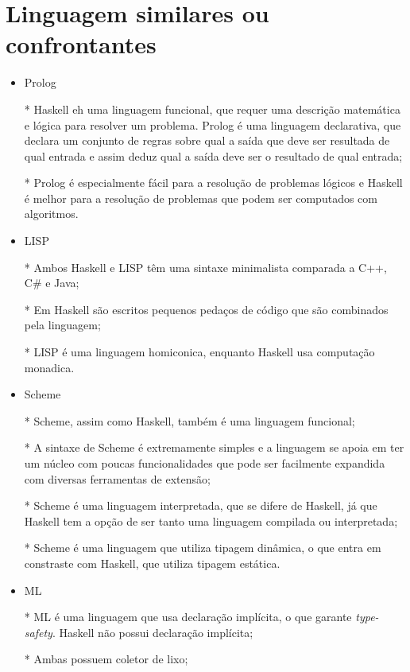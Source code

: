 \chapter{Linguagem similares ou confrontantes}

    \begin{itemize}
      \item Prolog
      
      * Haskell eh uma linguagem funcional, que requer uma descrição matemática e lógica para resolver um problema. Prolog é uma linguagem declarativa, 
      que declara um conjunto de regras sobre qual a saída que deve ser resultada de qual entrada e assim deduz qual a saída deve ser o resultado de qual entrada;

      * Prolog é especialmente fácil para a resolução de problemas lógicos e Haskell é melhor para a resolução de problemas que podem ser computados com algoritmos.

      \item LISP 
      
      * Ambos Haskell e LISP têm uma sintaxe minimalista comparada a C++, C\# e Java;

      * Em Haskell são escritos pequenos pedaços de código que são combinados pela linguagem;

      * LISP é uma linguagem homiconica, enquanto Haskell usa computação monadica.

      \item Scheme 
      
      * Scheme, assim como Haskell, também é uma linguagem funcional;

      * A sintaxe de Scheme é extremamente simples e a linguagem se apoia em ter um núcleo com poucas funcionalidades que pode ser 
      facilmente expandida com diversas ferramentas de extensão;

      * Scheme é uma linguagem interpretada, que se difere de Haskell, já que Haskell tem a opção de ser tanto uma linguagem compilada ou interpretada;

      * Scheme é uma linguagem que utiliza tipagem dinâmica, o que entra em constraste com Haskell, que utiliza tipagem estática.

      \item ML 
      
      * ML é uma linguagem que usa declaração implícita, o que garante \emph{type-safety}. Haskell não possui declaração implícita;

      * Ambas possuem coletor de lixo;


\end{itemize}
